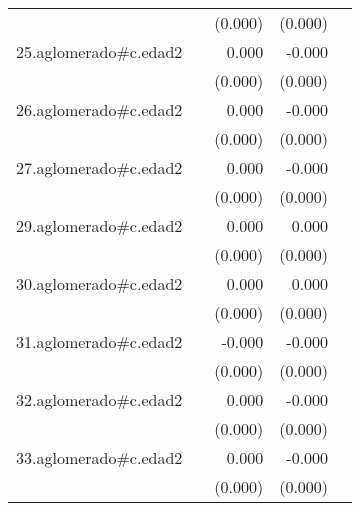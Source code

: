 {\begin{longtable}{l*{4}{D{.}{.}{-1}}}
            &                     &     (0.000)         &     (0.000)         &                     \\
\addlinespace
25.aglomerado#c.edad2&                     &       0.000         &      -0.000         &                     \\
            &                     &     (0.000)         &     (0.000)         &                     \\
\addlinespace
26.aglomerado#c.edad2&                     &       0.000         &      -0.000         &                     \\
            &                     &     (0.000)         &     (0.000)         &                     \\
\addlinespace
27.aglomerado#c.edad2&                     &       0.000         &      -0.000         &                     \\
            &                     &     (0.000)         &     (0.000)         &                     \\
\addlinespace
29.aglomerado#c.edad2&                     &       0.000\sym{*}  &       0.000         &                     \\
            &                     &     (0.000)         &     (0.000)         &                     \\
\addlinespace
30.aglomerado#c.edad2&                     &       0.000         &       0.000         &                     \\
            &                     &     (0.000)         &     (0.000)         &                     \\
\addlinespace
31.aglomerado#c.edad2&                     &      -0.000         &      -0.000\sym{***}&                     \\
            &                     &     (0.000)         &     (0.000)         &                     \\
\addlinespace
32.aglomerado#c.edad2&                     &       0.000         &      -0.000         &                     \\
            &                     &     (0.000)         &     (0.000)         &                     \\
\addlinespace
33.aglomerado#c.edad2&                     &       0.000         &      -0.000\sym{**} &                     \\
            &                     &     (0.000)         &     (0.000)         &                     \\

\end{longtable}}
